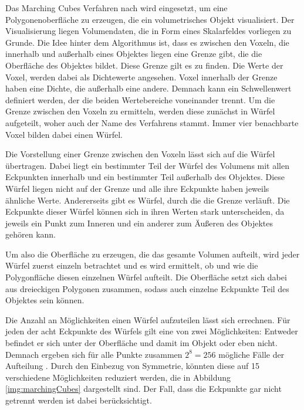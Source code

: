 Das Marching Cubes Verfahren nach \cite{Lorensen87} wird eingesetzt, um eine Polygonenoberfläche zu erzeugen, die ein volumetrisches Objekt visualisiert. 
Der Visualisierung liegen Volumendaten, die in Form eines Skalarfeldes vorliegen zu Grunde.
Die Idee hinter dem Algorithmus ist, dass es zwischen den Voxeln, die innerhalb und außerhalb eines Objektes liegen eine Grenze gibt, die die Oberfläche des Objektes bildet. Diese Grenze gilt es zu finden. 
Die Werte der Voxel, werden dabei als Dichtewerte angesehen. Voxel innerhalb der Grenze haben eine Dichte, die außerhalb eine andere. Demnach kann ein Schwellenwert definiert werden, der die beiden Wertebereiche voneinander trennt.
Um die Grenze zwischen den Voxeln zu ermitteln, werden diese zunächst in Würfel aufgeteilt, woher auch der Name des Verfahrens stammt. Immer vier benachbarte Voxel bilden dabei einen Würfel.  

Die Vorstellung einer Grenze zwischen den Voxeln lässt sich auf die Würfel übertragen. Dabei liegt ein bestimmter Teil der Würfel des Volumens mit allen Eckpunkten innerhalb und ein bestimmter Teil außerhalb des Objektes. Diese Würfel liegen nicht auf der Grenze und alle ihre Eckpunkte haben jeweils ähnliche Werte. Andererseits gibt es Würfel, durch die die Grenze verläuft. Die Eckpunkte dieser Würfel können sich in ihren Werten stark unterscheiden, da jeweils ein Punkt zum Inneren und ein anderer zum Äußeren des Objektes gehören kann. 

Um also die Oberfläche zu erzeugen, die das gesamte Volumen aufteilt, wird jeder Würfel zuerst einzeln betrachtet und es wird ermittelt, ob und wie die Polygonfläche diesen einzelnen Würfel aufteilt.  Die Oberfläche setzt sich dabei aus dreieckigen Polygonen zusammen, sodass auch einzelne Eckpunkte Teil des Objektes sein können.

Die Anzahl an Möglichkeiten einen Würfel aufzuteilen lässt sich errechnen. Für jeden der acht Eckpunkte des Würfels gilt eine von zwei Möglichkeiten: Entweder befindet er sich unter der Oberfläche und damit im Objekt oder eben nicht. Demnach ergeben sich für alle Punkte zusammen $2^8=256$ mögliche Fälle der Aufteilung \cite{aigner07}. Durch den Einbezug von Symmetrie, könnten diese auf 15 verschiedene Möglichkeiten reduziert werden, die in Abbildung \ref{img:marchingCubes} dargestellt sind. Der Fall, dass die Eckpunkte gar nicht getrennt werden ist dabei berücksichtigt. 

